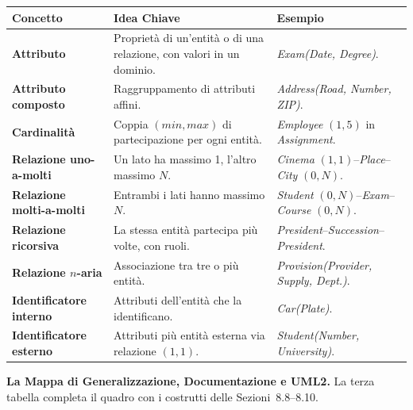 \documentclass[12pt]{extarticle}
\begin{document}
\begin{center}
\small
\begin{tabular}{@{}L{4.2cm}L{6.4cm}L{5.2cm}@{}}
    \toprule
    \textbf{Concetto} & \textbf{Idea Chiave} & \textbf{Esempio} \\
    \midrule
    \textbf{Attributo} & Proprietà di un'entità o di una relazione, con valori in un dominio. & \textit{Exam(Date, Degree)}. \\
    \addlinespace
    \textbf{Attributo composto} & Raggruppamento di attributi affini. & \textit{Address(Road, Number, ZIP)}. \\
    \addlinespace
    \textbf{Cardinalità} & Coppia $(min,max)$ di partecipazione per ogni entità. & \textit{Employee} $(1,5)$ in \textit{Assignment}. \\
    \addlinespace
    \textbf{Relazione uno-a-molti} & Un lato ha massimo 1, l'altro massimo $N$. & \textit{Cinema} $(1,1)$--\textit{Place}--\textit{City} $(0,N)$. \\
    \addlinespace
    \textbf{Relazione molti-a-molti} & Entrambi i lati hanno massimo $N$. & \textit{Student} $(0,N)$--\textit{Exam}--\textit{Course} $(0,N)$. \\
    \addlinespace
    \textbf{Relazione ricorsiva} & La stessa entità partecipa più volte, con ruoli. & \textit{President}--\textit{Succession}--\textit{President}. \\
    \addlinespace
    \textbf{Relazione $n$-aria} & Associazione tra tre o più entità. & \textit{Provision(Provider, Supply, Dept.)}. \\
    \addlinespace
    \textbf{Identificatore interno} & Attributi dell'entità che la identificano. & \textit{Car(Plate)}. \\
    \addlinespace
    \textbf{Identificatore esterno} & Attributi più entità esterna via relazione $(1,1)$. & \textit{Student(Number, University)}. \\
    \bottomrule
\end{tabular}
\end{center}

\clearpage
\noindent \textbf{La Mappa di Generalizzazione, Documentazione e UML2.} La terza tabella completa il quadro con i costrutti delle Sezioni~8.8--8.10.
\end{document}
